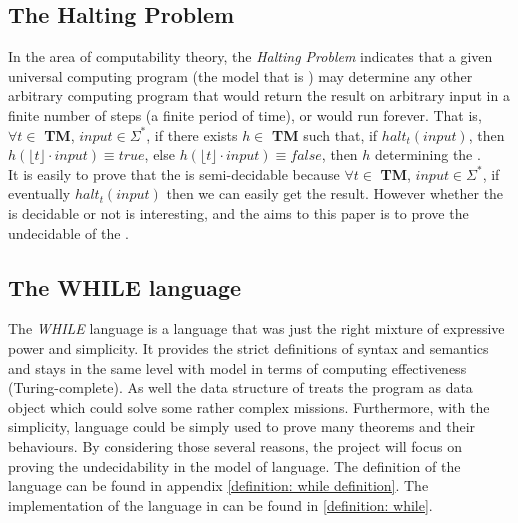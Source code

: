 \subsection{The Halting Problem}
\label{definition of h}
In the area of computability theory, the \textit{Halting Problem} indicates that a given universal computing program (the model that is \cite{jones_computability_1997}) 
may determine any other arbitrary computing program that would return the result on arbitrary input in a finite number of steps (a finite period of time), or would run forever\cite{_halting_2015}.
That is, $\forall t \in$ \textbf{TM}, $input \in \Sigma^{*}$, if there exists $h \in$ \textbf{TM} such that, if $halt_{t}(input)$, then $h(\lfloor t\rfloor \cdot input) \equiv true$, else $h(\lfloor t\rfloor \cdot input) \equiv false$, then $h$ determining the .\\
It is easily to prove that the  is semi-decidable\cite{_halting_2015} because $\forall t \in$ \textbf{TM}, $input \in \Sigma^{*}$, if eventually $halt_{t}(input)$ then we can easily get the result.
However whether the  is decidable or not is interesting, and the aims to this paper is to prove the undecidable of the .

\subsection{The WHILE language}
The \textit{WHILE} language is a language that was just the right mixture of expressive power and simplicity. 
It provides the strict definitions of syntax and semantics and stays in the same level with  model in terms of computing effectiveness (Turing-complete)\cite{jones_computability_1997}. 
As well the data structure of \WHILE treats the program as data object which could solve some rather complex missions. 
Furthermore, with the simplicity, \WHILE language could be simply used to prove many theorems and their behaviours. 
By considering those several reasons, the project will focus on proving the  undecidability in the model of \WHILE language\cite{jones_computability_1997}.
The definition of the \WHILE language can be found in appendix \ref{definition: while definition}.
The implementation of the \WHILE language in \Agda can be found in \ref{definition: while}.

